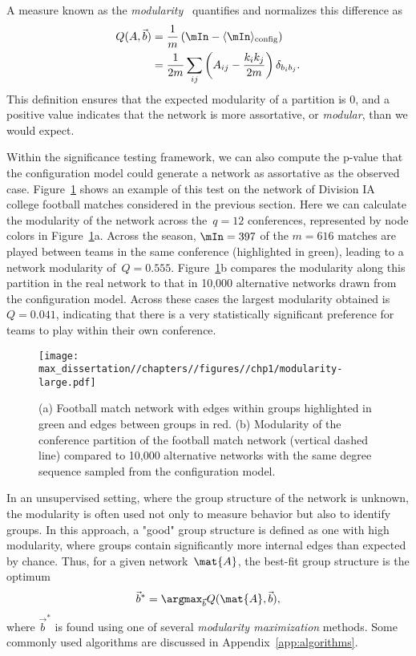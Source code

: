 A measure known as the \emph{modularity}~\cite{Newman06b} quantifies and normalizes this difference as \begin{align}
    Q(A,\vec{b}) &= \frac{1}{m}\left(\mIn - \langle \mIn \rangle_{\text{config}}\right) \nonumber \\
    &= \frac{1}{2m}\sum_{ij} \left(A_{ij} - \frac{k_ik_j}{2m}\right) \delta_{b_ib_j}. \label{eq:modularity}
\end{align}
This definition ensures that the expected modularity of a partition is 0, and a positive value indicates that the network is more assortative, or \emph{modular}, than we would expect.

Within the significance testing framework, we can also compute the p-value that the configuration model could generate a network as assortative as the observed case. Figure~\ref{fig:modularity-large} shows an example of this test on the network of Division IA college football matches considered in the previous section. Here we can calculate the modularity of the network across the~$q = 12$ conferences, represented by node colors in Figure~\ref{fig:modularity-large}a. Across the season, $\mIn = 397$ of the $m = 616$ matches are played between teams in the same conference (highlighted in green), leading to a network modularity of~$Q = 0.555$. Figure~\ref{fig:modularity-large}b compares the modularity along this partition in the real network to that in 10,000 alternative networks drawn from the configuration model. Across these cases the largest modularity obtained is~$Q = 0.041$, indicating that there is a very statistically significant preference for teams to play within their own conference. 

\begin{figure}
    \centering
    \texttt{[image: max\_dissertation//chapters//figures//chp1/modularity-large.pdf]}
    \caption{(a) Football match network with edges within groups highlighted in green and edges between groups in red. (b) Modularity of the conference partition of the football match network (vertical dashed line) compared to 10,000 alternative networks with the same degree sequence sampled from the configuration model.}
    \label{fig:modularity-large}
\end{figure}

In an unsupervised setting, where the group structure of the network is unknown, the modularity is often used not only to measure behavior but also to identify groups. In this approach, a "good" group structure is defined as one with high modularity, where groups contain significantly more internal edges than expected by chance. Thus, for a given network~$\mat{A}$, the best-fit group structure is the optimum \begin{align}
    \vec{b}^* = \argmax_{\vec{b}} Q(\mat{A},\vec{b}),
\end{align}
where $\vec{b}^*$ is found using one of several \emph{modularity maximization} methods. Some commonly used algorithms are discussed in Appendix~\ref{app:algorithms}. 


